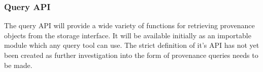 
\subsubsection{Query API}
The query API will provide a wide variety of functions for retrieving provenance objects from the storage interface. It will be available initially as an importable module which any query tool can use. The strict definition of it's API has not yet been created as further investigation into the form of provenance queries needs to be made.
